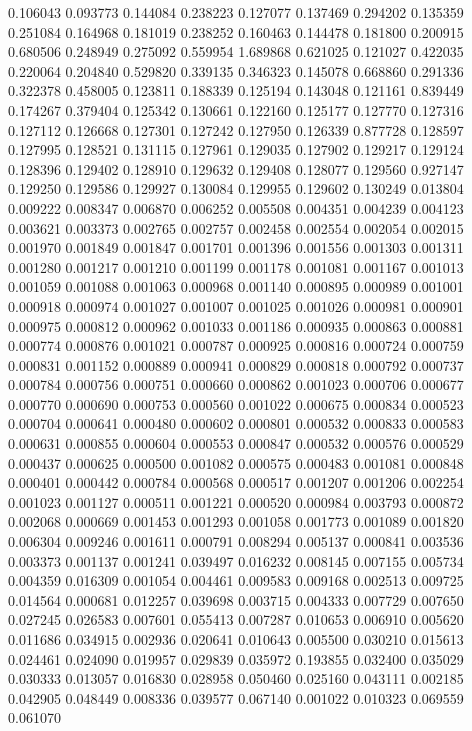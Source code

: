 0.106043
0.093773
0.144084
0.238223
0.127077
0.137469
0.294202
0.135359
0.251084
0.164968
0.181019
0.238252
0.160463
0.144478
0.181800
0.200915
0.680506
0.248949
0.275092
0.559954
1.689868
0.621025
0.121027
0.422035
0.220064
0.204840
0.529820
0.339135
0.346323
0.145078
0.668860
0.291336
0.322378
0.458005
0.123811
0.188339
0.125194
0.143048
0.121161
0.839449
0.174267
0.379404
0.125342
0.130661
0.122160
0.125177
0.127770
0.127316
0.127112
0.126668
0.127301
0.127242
0.127950
0.126339
0.877728
0.128597
0.127995
0.128521
0.131115
0.127961
0.129035
0.127902
0.129217
0.129124
0.128396
0.129402
0.128910
0.129632
0.129408
0.128077
0.129560
0.927147
0.129250
0.129586
0.129927
0.130084
0.129955
0.129602
0.130249
0.013804
0.009222
0.008347
0.006870
0.006252
0.005508
0.004351
0.004239
0.004123
0.003621
0.003373
0.002765
0.002757
0.002458
0.002554
0.002054
0.002015
0.001970
0.001849
0.001847
0.001701
0.001396
0.001556
0.001303
0.001311
0.001280
0.001217
0.001210
0.001199
0.001178
0.001081
0.001167
0.001013
0.001059
0.001088
0.001063
0.000968
0.001140
0.000895
0.000989
0.001001
0.000918
0.000974
0.001027
0.001007
0.001025
0.001026
0.000981
0.000901
0.000975
0.000812
0.000962
0.001033
0.001186
0.000935
0.000863
0.000881
0.000774
0.000876
0.001021
0.000787
0.000925
0.000816
0.000724
0.000759
0.000831
0.001152
0.000889
0.000941
0.000829
0.000818
0.000792
0.000737
0.000784
0.000756
0.000751
0.000660
0.000862
0.001023
0.000706
0.000677
0.000770
0.000690
0.000753
0.000560
0.001022
0.000675
0.000834
0.000523
0.000704
0.000641
0.000480
0.000602
0.000801
0.000532
0.000833
0.000583
0.000631
0.000855
0.000604
0.000553
0.000847
0.000532
0.000576
0.000529
0.000437
0.000625
0.000500
0.001082
0.000575
0.000483
0.001081
0.000848
0.000401
0.000442
0.000784
0.000568
0.000517
0.001207
0.001206
0.002254
0.001023
0.001127
0.000511
0.001221
0.000520
0.000984
0.003793
0.000872
0.002068
0.000669
0.001453
0.001293
0.001058
0.001773
0.001089
0.001820
0.006304
0.009246
0.001611
0.000791
0.008294
0.005137
0.000841
0.003536
0.003373
0.001137
0.001241
0.039497
0.016232
0.008145
0.007155
0.005734
0.004359
0.016309
0.001054
0.004461
0.009583
0.009168
0.002513
0.009725
0.014564
0.000681
0.012257
0.039698
0.003715
0.004333
0.007729
0.007650
0.027245
0.026583
0.007601
0.055413
0.007287
0.010653
0.006910
0.005620
0.011686
0.034915
0.002936
0.020641
0.010643
0.005500
0.030210
0.015613
0.024461
0.024090
0.019957
0.029839
0.035972
0.193855
0.032400
0.035029
0.030333
0.013057
0.016830
0.028958
0.050460
0.025160
0.043111
0.002185
0.042905
0.048449
0.008336
0.039577
0.067140
0.001022
0.010323
0.069559
0.061070
